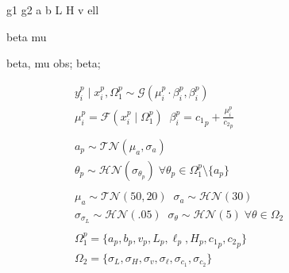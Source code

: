 \documentclass[a4paper,12pt]{article}
\begin{document}
\begin{minipage}{.5\textwidth}
\begin{figure}[H]
{            %

             {g1}
             {g2}
             {a}
             {b}
             {L}
             {H}
             {v}
             {ell}

             {beta}
             {mu}

             {beta, mu}
             {obs};
             {beta};
        }
    \end{figure}
\end{minipage}
\begin{minipage}{.6\textwidth}
    \begin{align*}
        &y_i^p \mid x_i^p, \Omega_1^p \sim \mathcal{G}\left(\mu_i^p\cdot\beta_i^p, \beta_i^p\right) \\
        &\mu_i^p = \mathcal{F}\left(x_i^p \mid \Omega_1^p\right) \;\; \beta_i^p = {c_1}_p + \frac{\mu_i^p}{{c_2}_p}\\\\
        &a_p \sim \mathcal{TN}\left(\mu_a, \sigma_a\right)\\
        &\theta_p \sim \mathcal{HN}\left(\sigma_{\theta_p}\right) \; \forall \theta_p \in \Omega_1^p \setminus \{a_p\}\\\\
        & \mu_a \sim \mathcal{TN}\left(50, 20\right)\;\; \sigma_a \sim \mathcal{HN}\left(30\right)\\
        &\sigma_{\sigma_L} \sim \mathcal{HN}\left(.05\right) \;\; \sigma_\theta \sim \mathcal{HN}\left(5\right) \;\forall \theta \in \Omega_2\\\\
        &\Omega_1^p = \{ a_p, b_p, v_p, L_p, \ell_p, H_p, {c_1}_p, {c_2}_p\}\\
        &\Omega_2 = \{\sigma_{L}, \sigma_{H}, \sigma_{v}, \sigma_{\ell}, \sigma_{c_1}, \sigma_{c_2}\}
    \end{align*}
\end{minipage}\\\\
\end{document}
